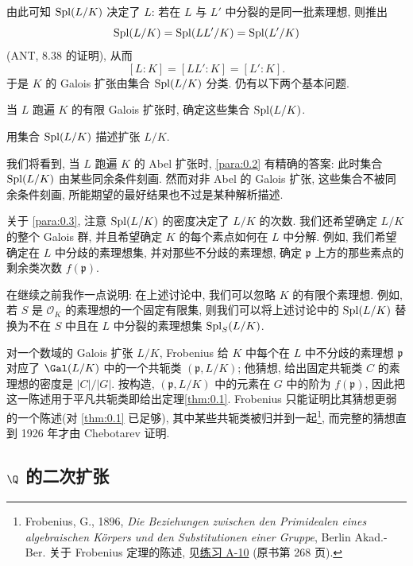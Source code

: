 由此可知 $\operatorname{Spl}(L/K)$ 决定了 $L$: 若在 $L$ 与 $L'$ 中分裂的是同一批素理想, 则推出
\[
\operatorname{Spl}(L/K) = \operatorname{Spl}(LL'/K) = \operatorname{Spl}(L'/K)
\]
(ANT, 8.38 的证明), 从而
\[
[L:K] = [LL':K] = [L':K].
\]
于是 $K$ 的 Galois 扩张由集合 $\operatorname{Spl}(L/K)$ 分类. 仍有以下两个基本问题.

\begin{npara}\label{para:0.2} 当 $L$ 跑遍 $K$ 的有限 Galois 扩张时, 确定这些集合 $\operatorname{Spl}(L/K)$.
\end{npara}

\begin{npara}\label{para:0.3} 用集合 $\operatorname{Spl}(L/K)$ 描述扩张 $L/K$.
\end{npara}

我们将看到, 当 $L$ 跑遍 $K$ 的 Abel 扩张时, \ref{para:0.2} 有精确的答案: 此时集合 $\operatorname{Spl}(L/K)$ 由某些同余条件刻画. 然而对非 Abel 的 Galois 扩张, 这些集合不被同余条件刻画, 所能期望的最好结果也不过是某种解析描述.

关于 \ref{para:0.3}, 注意 $\operatorname{Spl}(L/K)$ 的密度决定了 $L/K$ 的次数. 我们还希望确定 $L/K$ 的整个 Galois 群, 并且希望确定 $K$ 的每个素点如何在 $L$ 中分解. 例如, 我们希望确定在 $L$ 中分歧的素理想集, 并对那些不分歧的素理想, 确定 $\mathfrak{p}$ 上方的那些素点的剩余类次数 $f(\mathfrak{p})$.

在继续之前我作一点说明: 在上述讨论中, 我们可以忽略 $K$ 的有限个素理想. 例如, 若 $S$ 是 $\mathcal{O}_{K}$ 的素理想的一个固定有限集, 则我们可以将上述讨论中的 $\operatorname{Spl}(L/K)$ 替换为不在 $S$ 中且在 $L$ 中分裂的素理想集 $\operatorname{Spl}_{S}(L/K)$.

\begin{NOTES}
\label{pg:orig3}对一个数域的 Galois 扩张 $L/K$, Frobenius 给 $K$ 中每个在 $L$ 中不分歧的素理想 $\mathfrak{p}$ 对应了 $\Gal(L/K)$ 中的一个共轭类 $(\mathfrak{p}, L/K)$; 他猜想, 给出固定共轭类 $C$ 的素理想的密度是 $|C|/|G|$. 按构造, $(\mathfrak{p}, L/K)$ 中的元素在 $G$ 中的阶为 $f(\mathfrak{p})$, 因此把这一陈述用于平凡共轭类即给出定理\ref{thm:0.1}. Frobenius 只能证明比其猜想更弱的一个陈述(对 \ref{thm:0.1} 已足够), 其中某些共轭类被归并到一起\footnote{Frobenius, G., 1896, \emph{Die Beziehungen zwischen den Primidealen eines algebraischen K\"orpers und den Substitutionen einer Gruppe}, Berlin Akad.-Ber. 关于 Frobenius 定理的陈述, 见\hyperlink{item:viii.A-10}{练习 A-10} (原书第 268 页).}, 而完整的猜想直到 1926 年才由 Chebotarev 证明.
\end{NOTES}

\subsection*{$\Q$ 的二次扩张}

